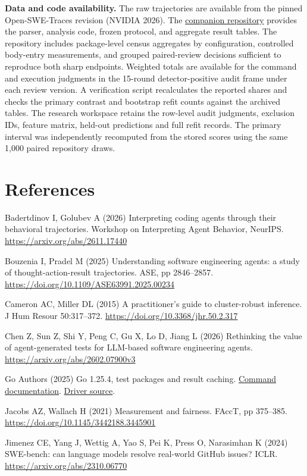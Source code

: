 \documentclass[10pt,a4paper]{article}
\begin{document}
\textbf{Data and code availability.} The raw trajectories are available from the pinned Open-SWE-Traces revision (NVIDIA 2026). The \href{https://github.com/fightforbelief/coding-agent-uncertainty-audit}{companion repository} provides the parser, analysis code, frozen protocol, and aggregate result tables. The repository includes package-level census aggregates by configuration, controlled body-entry measurements, and grouped paired-review decisions sufficient to reproduce both sharp endpoints. Weighted totals are available for the command and execution judgments in the 15-round detector-positive audit frame under each review version. A verification script recalculates the reported shares and checks the primary contrast and bootstrap refit counts against the archived tables. The research workspace retains the row-level audit judgments, exclusion IDs, feature matrix, held-out predictions and full refit records. The primary interval was independently recomputed from the stored scores using the same 1,000 paired repository draws.

\section{References}
Badertdinov I, Golubev A (2026) Interpreting coding agents through their behavioral trajectories. Workshop on Interpreting Agent Behavior, NeurIPS. \url{https://arxiv.org/abs/2611.17440}

Bouzenia I, Pradel M (2025) Understanding software engineering agents: a study of thought-action-result trajectories. ASE, pp 2846--2857. \url{https://doi.org/10.1109/ASE63991.2025.00234}

Cameron AC, Miller DL (2015) A practitioner's guide to cluster-robust inference. J Hum Resour 50:317--372. \url{https://doi.org/10.3368/jhr.50.2.317}

Chen Z, Sun Z, Shi Y, Peng C, Gu X, Lo D, Jiang L (2026) Rethinking the value of agent-generated tests for LLM-based software engineering agents. \url{https://arxiv.org/abs/2602.07900v3}

Go Authors (2025) Go 1.25.4, test packages and result caching. \href{https://pkg.go.dev/cmd/go@go1.25.4#hdr-Test_packages}{Command documentation}. \href{https://go.googlesource.com/go/+/refs/tags/go1.25.4/src/cmd/go/internal/test/test.go}{Driver source}.

Jacobs AZ, Wallach H (2021) Measurement and fairness. FAccT, pp 375--385. \url{https://doi.org/10.1145/3442188.3445901}

Jimenez CE, Yang J, Wettig A, Yao S, Pei K, Press O, Narasimhan K (2024) SWE-bench: can language models resolve real-world GitHub issues? ICLR. \url{https://arxiv.org/abs/2310.06770}
\end{document}
